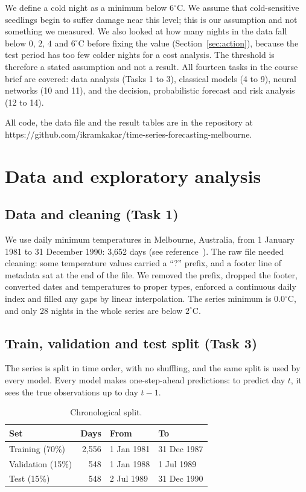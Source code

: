 \documentclass[11pt,a4paper]{article}
\newcommand{\GitHub}{https://github.com/ikramkakar/time-series-forecasting-melbourne}
\begin{document}
We define a cold night as a minimum below $6^\circ$C. We assume that cold-sensitive seedlings begin to suffer damage near this level; this is our assumption and not something we measured. We also looked at how many nights in the data fall below $0$, $2$, $4$ and $6^\circ$C before fixing the value (Section~\ref{sec:action}), because the test period has too few colder nights for a cost analysis. The threshold is therefore a stated assumption and not a result. All fourteen tasks in the course brief are covered: data analysis (Tasks 1 to 3), classical models (4 to 9), neural networks (10 and 11), and the decision, probabilistic forecast and risk analysis (12 to 14).

All code, the data file and the result tables are in the repository at \GitHub.

\section{Data and exploratory analysis}
\subsection{Data and cleaning (Task 1)}
We use daily minimum temperatures in Melbourne, Australia, from 1 January 1981 to 31 December 1990: 3,652 days (see reference~\cite{tsdl}). The raw file needed cleaning: some temperature values carried a ``?'' prefix, and a footer line of metadata sat at the end of the file. We removed the prefix, dropped the footer, converted dates and temperatures to proper types, enforced a continuous daily index and filled any gaps by linear interpolation. The series minimum is $0.0^\circ$C, and only 28 nights in the whole series are below $2^\circ$C.

\subsection{Train, validation and test split (Task 3)}
The series is split in time order, with no shuffling, and the same split is used by every model. Every model makes one-step-ahead predictions: to predict day $t$, it sees the true observations up to day $t-1$.

\begin{table}[H]\centering
\caption{Chronological split.}
\begin{tabular}{lrll}
\toprule
Set & Days & From & To\\
\midrule
Training (70\%) & 2,556 & 1 Jan 1981 & 31 Dec 1987\\
Validation (15\%) & 548 & 1 Jan 1988 & 1 Jul 1989\\
Test (15\%) & 548 & 2 Jul 1989 & 31 Dec 1990\\
\bottomrule
\end{tabular}
\end{table}
\end{document}
